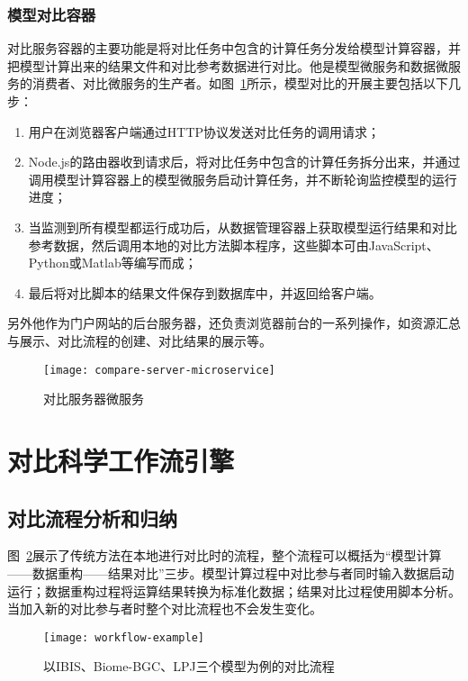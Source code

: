 \subsubsection{模型对比容器}
对比服务容器的主要功能是将对比任务中包含的计算任务分发给模型计算容器，并把模型计算出来的结果文件和对比参考数据进行对比。他是模型微服务和数据微服务的消费者、对比微服务的生产者。如图~\ref{fig:compare-server-microservice}所示，模型对比的开展主要包括以下几步：

\begin{enumerate}[(1)]
\item 用户在浏览器客户端通过HTTP协议发送对比任务的调用请求；
\item Node.js的路由器收到请求后，将对比任务中包含的计算任务拆分出来，并通过调用模型计算容器上的模型微服务启动计算任务，并不断轮询监控模型的运行进度；
\item 当监测到所有模型都运行成功后，从数据管理容器上获取模型运行结果和对比参考数据，然后调用本地的对比方法脚本程序，这些脚本可由JavaScript、Python或Matlab等编写而成；
\item 最后将对比脚本的结果文件保存到数据库中，并返回给客户端。
\end{enumerate}

另外他作为门户网站的后台服务器，还负责浏览器前台的一系列操作，如资源汇总与展示、对比流程的创建、对比结果的展示等。

\begin{figure}[!htbp]
    \centering
    \texttt{[image: compare-server-microservice]}
    \caption{对比服务器微服务}
    \label{fig:compare-server-microservice}
\end{figure}

\section{对比科学工作流引擎}

\subsection{对比流程分析和归纳}
图~\ref{fig:workflow-example}展示了传统方法在本地进行对比时的流程，整个流程可以概括为“模型计算——数据重构——结果对比”三步。模型计算过程中对比参与者同时输入数据启动运行；数据重构过程将运算结果转换为标准化数据；结果对比过程使用脚本分析。当加入新的对比参与者时整个对比流程也不会发生变化。

\begin{figure}[!htbp]
    \centering
    \texttt{[image: workflow-example]}
    \caption{以IBIS、Biome-BGC、LPJ三个模型为例的对比流程}
    \label{fig:workflow-example}
\end{figure}


